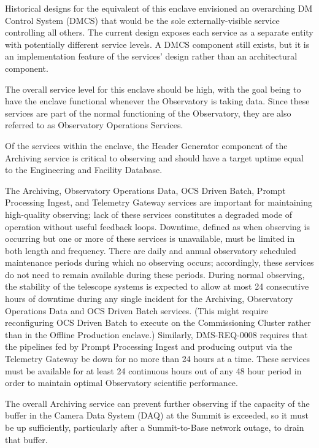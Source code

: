 \documentclass[DM,toc]{lsstdoc}
\begin{document}
Historical designs for the equivalent of this enclave envisioned an overarching DM Control System (DMCS) that would be the sole externally-visible service controlling all others.
The current design exposes each service as a separate entity with potentially different service levels.
A DMCS component still exists, but it is an implementation feature of the services' design rather than an architectural component.

The overall service level for this enclave should be high, with the goal being to have the enclave functional whenever the Observatory is taking data.
Since these services are part of the normal functioning of the Observatory, they are also referred to as Observatory Operations Services.

Of the services within the enclave, the Header Generator component of the Archiving service is critical to observing and should have a target uptime equal to the Engineering and Facility Database.

The Archiving, Observatory Operations Data, OCS Driven Batch, Prompt Processing Ingest, and Telemetry Gateway services are important for maintaining high-quality observing; lack of these services constitutes a degraded mode of operation without useful feedback loops.
Downtime, defined as when observing is occurring but one or more of these services is unavailable, must be limited in both length and frequency.
There are daily and annual observatory scheduled maintenance periods during which no observing occurs; accordingly, these services do not need to remain available during these periods.
During normal observing, the stability of the telescope systems is expected to allow at most 24 consecutive hours of downtime during any single incident for the Archiving, Observatory Operations Data and OCS Driven Batch services.
(This might require reconfiguring OCS Driven Batch to execute on the Commissioning Cluster rather than in the Offline Production enclave.)
Similarly, DMS-REQ-0008 requires that the pipelines fed by Prompt Processing Ingest and producing output via the Telemetry Gateway be down for no more than 24 hours at a time.
These services must be available for at least 24 continuous hours out of any 48 hour period in order to maintain optimal Observatory scientific performance.

The overall Archiving service can prevent further observing if the capacity of the buffer in the Camera Data System (DAQ) at the Summit is exceeded, so it must be up sufficiently, particularly after a Summit-to-Base network outage, to drain that buffer.
\end{document}
